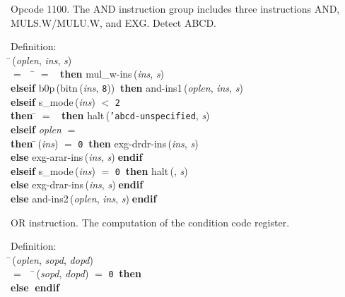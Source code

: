  Opcode 1100.
 The AND instruction group includes three instructions AND, MULS.W/MULU.W,
 and EXG.  Detect ABCD.
\begin{tabbing}{\sc Definition}: \\  
\=\,({\it{oplen\/}}, {\it{ins\/}}, {\it{s\/}}) \\ 
$=$$\;\;\;\;$\= $=$ {}$\;\;${\bf then }{\rm{mul\_w-ins}}\,({\it{ins\/}}, {\it{s\/}}) \\ 
{\bf elseif }{\rm{b0p}}\,({\rm{bitn}}\,({\it{ins\/}}, {\tt{8}}))$\;\;${\bf then }{\rm{and-ins1}}\,({\it{oplen\/}}, {\it{ins\/}}, {\it{s\/}}) \\ 
{\bf elseif }{\rm{s\_mode}}\,({\it{ins\/}}) $<$ {\tt{2}} \\ 
{\bf then }\= $=$ {}$\;\;${\bf then }{\rm{halt}}\,({\tt{'}}{\tt{abcd-unspecified}}, {\it{s\/}}) \\ 
{\bf elseif }{\it{oplen\/}} $=$ {} \\ 
{\bf then }\=\,({\it{ins\/}}) $=$ {\tt{0}}$\;\;${\bf then }{\rm{exg-drdr-ins}}\,({\it{ins\/}}, {\it{s\/}}) \\ 
{\bf else }{\rm{exg-arar-ins}}\,({\it{ins\/}}, {\it{s\/}})$\;${\bf  endif}\- \\ 
{\bf elseif }{\rm{s\_mode}}\,({\it{ins\/}}) $=$ {\tt{0}}$\;\;${\bf then }{\rm{halt}}\,({}, {\it{s\/}}) \\ 
{\bf else }{\rm{exg-drar-ins}}\,({\it{ins\/}}, {\it{s\/}})$\;${\bf  endif}\- \\ 
{\bf else }{\rm{and-ins2}}\,({\it{oplen\/}}, {\it{ins\/}}, {\it{s\/}})$\;${\bf  endif}\-\-
\end{tabbing}

 OR instruction.
 The computation of the condition code register.
\begin{tabbing}{\sc Definition}: \\  
\=\,({\it{oplen\/}}, {\it{sopd\/}}, {\it{dopd\/}}) \\ 
$=$$\;\;\;\;$\=\,({\it{sopd\/}}, {\it{dopd\/}}) $=$ {\tt{0}}$\;\;${\bf then }{} \\ 
{\bf else }{}$\;${\bf  endif}\-\-
\end{tabbing}

